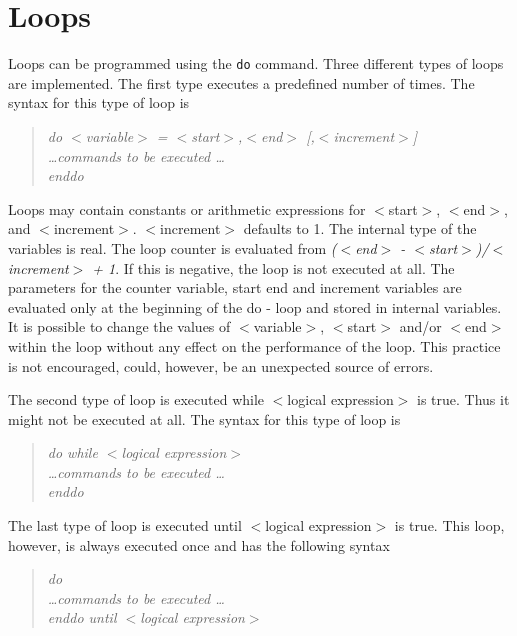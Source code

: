 
\section{Loops \label{do}}

Loops can be programmed using the {\tt do} command.
Three different types of loops are implemented. The first type
executes a predefined number of times. The syntax for this type of
loop is

\begin{quote}
{\it do $<$variable$>$ = $<$start$>$,$<$end$>$ [,$<$increment$>$] \\
     \ldots commands to be executed \ldots \\
     enddo }
\end{quote}

Loops may contain constants or arithmetic expressions for
$<$start$>$, $<$end$>$, and $<$increment$>$.  $<$increment$>$
defaults to 1.  The internal type of the variables is real.  The
loop counter is evaluated from {\it ($<$end$>$ -
$<$start$>$)/$<$increment$>$ + 1}. If this is negative, the loop is
not executed at all.  The parameters for the counter variable, start
end and increment variables are evaluated only at the beginning of
the do - loop and stored in internal variables.  It is possible to
change the values of $<$variable$>$, $<$start$>$ and/or $<$end$>$
within the loop without any effect on the performance of the loop.
This practice is not encouraged, could, however, be an unexpected
source of errors. \par

The second type of loop is executed while $<$logical expression$>$ is
true. Thus it might not be executed at all. The syntax for this type
of loop is

\begin{quote}
{\it do while $<$logical expression$>$ \\
     \ldots commands to be executed \ldots \\
     enddo }
\end{quote}

The last type of loop is executed until $<$logical expression$>$ is
true. This loop, however, is always executed once and has the
following syntax

\begin{quote}
{\it do \\
     \ldots commands to be executed \ldots \\
     enddo until $<$logical expression$>$ }
\end{quote}

